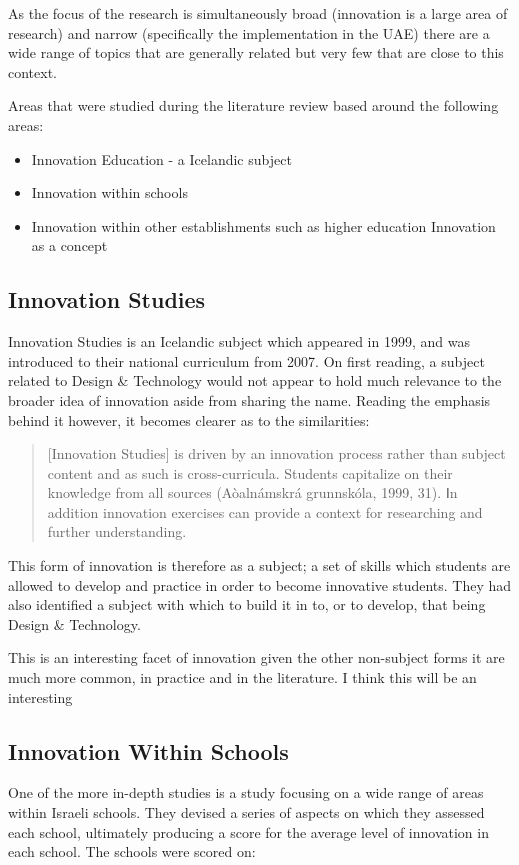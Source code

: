 As the focus of the research is simultaneously broad (innovation is a large area of research) and narrow (specifically the implementation in the UAE) there are a wide range of topics that are generally related but very few that are close to this context. 

Areas that were studied during the literature review based around the following areas:
\begin{itemize}
\item Innovation Education - a Icelandic subject
\item Innovation within schools
\item Innovation within other establishments such as higher education
\ite Innovation as a concept
\end{itemize}

\subsection{Innovation Studies}
Innovation Studies is an Icelandic subject which appeared in 1999, and was introduced to their national curriculum from 2007. On first reading, a subject related to Design & Technology would not appear to hold much relevance to the broader idea of innovation aside from sharing the name. Reading the emphasis behind it however, it becomes clearer as to the similarities:
\begin{quote}
[Innovation Studies] is driven by an innovation process rather than subject content and as such is cross-curricula. Students capitalize on their
knowledge from all sources (Aòalnámskrá grunnskóla, 1999, 31). Ⅰn addition innovation exercises can provide a context for researching and further understanding.
\end{quote} \cite{thorsteinsson2005innovation}

This form of innovation is therefore as a subject; a set of skills which students are allowed to develop and practice in order to become innovative students. They had also identified a subject with which to build it in to, or to develop, that being Design & Technology.

This is an interesting facet of innovation given the other non-subject forms it are much more common, in practice and in the literature. I think this will be an interesting 

\subsection{Innovation Within Schools}
One of the more in-depth studies is a study focusing on a wide range of areas within Israeli schools. \cite{tubin2003domains} They devised a series of aspects on which they assessed each school, ultimately producing a score for the average level of innovation in each school. The schools were scored on:

